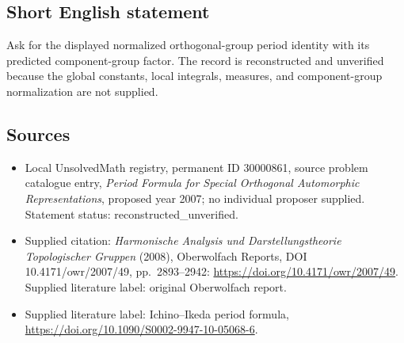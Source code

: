 \documentclass[11pt]{article}
\begin{document}
\subsection{Short English statement}
Ask for the displayed normalized orthogonal-group period identity with its predicted component-group factor. The record is reconstructed and unverified because the global constants, local integrals, measures, and component-group normalization are not supplied.
\subsection{Sources}
\begin{itemize}\item Local UnsolvedMath registry, permanent ID 30000861, source problem catalogue entry, \emph{Period Formula for Special Orthogonal Automorphic Representations}, proposed year 2007; no individual proposer supplied. Statement status: reconstructed\_unverified.\item Supplied citation: \emph{Harmonische Analysis und Darstellungstheorie Topologischer Gruppen} (2008), Oberwolfach Reports, DOI 10.4171/owr/2007/49, pp.\ 2893--2942: \url{https://doi.org/10.4171/owr/2007/49}. Supplied literature label: original Oberwolfach report.\item Supplied literature label: Ichino--Ikeda period formula, \url{https://doi.org/10.1090/S0002-9947-10-05068-6}.\end{itemize}
\end{document}
